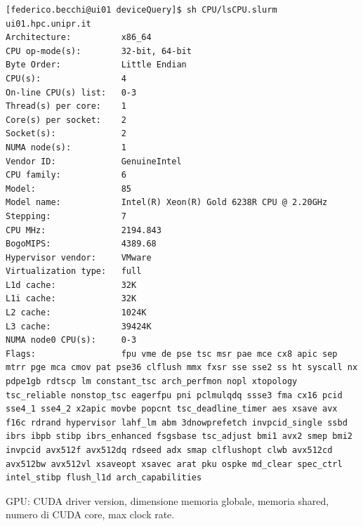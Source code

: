 \documentclass[11pt,a4paper]{article}
\begin{document}
\begin{lstlisting}
[federico.becchi@ui01 deviceQuery]$ sh CPU/lsCPU.slurm
ui01.hpc.unipr.it
Architecture:          x86_64
CPU op-mode(s):        32-bit, 64-bit
Byte Order:            Little Endian
CPU(s):                4
On-line CPU(s) list:   0-3
Thread(s) per core:    1
Core(s) per socket:    2
Socket(s):             2
NUMA node(s):          1
Vendor ID:             GenuineIntel
CPU family:            6
Model:                 85
Model name:            Intel(R) Xeon(R) Gold 6238R CPU @ 2.20GHz
Stepping:              7
CPU MHz:               2194.843
BogoMIPS:              4389.68
Hypervisor vendor:     VMware
Virtualization type:   full
L1d cache:             32K
L1i cache:             32K
L2 cache:              1024K
L3 cache:              39424K
NUMA node0 CPU(s):     0-3
Flags:                 fpu vme de pse tsc msr pae mce cx8 apic sep mtrr pge mca cmov pat pse36 clflush mmx fxsr sse sse2 ss ht syscall nx pdpe1gb rdtscp lm constant_tsc arch_perfmon nopl xtopology tsc_reliable nonstop_tsc eagerfpu pni pclmulqdq ssse3 fma cx16 pcid sse4_1 sse4_2 x2apic movbe popcnt tsc_deadline_timer aes xsave avx f16c rdrand hypervisor lahf_lm abm 3dnowprefetch invpcid_single ssbd ibrs ibpb stibp ibrs_enhanced fsgsbase tsc_adjust bmi1 avx2 smep bmi2 invpcid avx512f avx512dq rdseed adx smap clflushopt clwb avx512cd avx512bw avx512vl xsaveopt xsavec arat pku ospke md_clear spec_ctrl intel_stibp flush_l1d arch_capabilities
\end{lstlisting}

GPU: CUDA driver version, dimensione memoria globale, memoria shared, numero di CUDA core, max clock rate.
\end{document}
